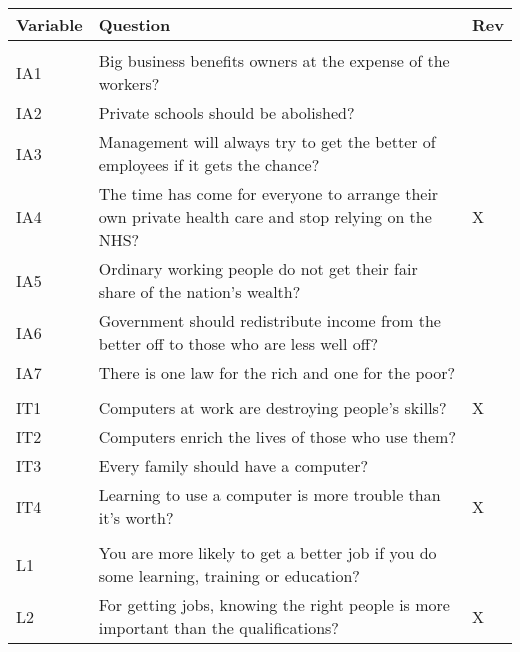 
\begin{tabular}{lll}
\toprule
Variable & Question & Rev\\
\midrule
\addlinespace[0.3em]
\multicolumn{3}{l}{\textbf{Inequality Aversion (IA)}}\\
\hline
\hspace{1em}IA1 & Big business benefits owners at the expense of the workers? & \\
\hspace{1em}IA2 & Private schools should be abolished? & \\
\hspace{1em}IA3 & Management will always try to get the better of employees if it gets the chance? & \\
\hspace{1em}IA4 & The time has come for everyone to arrange their own private health care and stop relying on the NHS? & X\\
\hspace{1em}IA5 & Ordinary working people do not get their fair share of the nation's wealth? & \\
\hspace{1em}IA6 & Government should redistribute income from the better off to those who are less well off? & \\
\hspace{1em}IA7 & There is one law for the rich and one for the poor? & \\
\addlinespace[0.3em]
\multicolumn{3}{l}{\textbf{Information Technology (IT)}}\\
\hline
\hspace{1em}IT1 & Computers at work are destroying people's skills? & X\\
\hspace{1em}IT2 & Computers enrich the lives of those who use them? & \\
\hspace{1em}IT3 & Every family should have a computer? & \\
\hspace{1em}IT4 & Learning to use a computer is more trouble than it's worth? & X\\
\addlinespace[0.3em]
\multicolumn{3}{l}{\textbf{Learning (L)}}\\
\hline
\hspace{1em}L1 & You are more likely to get a better job if you do some learning, training or education? & \\
\hspace{1em}L2 & For getting jobs, knowing the right people is more important than the qualifications? & X\\

\end{tabular}
